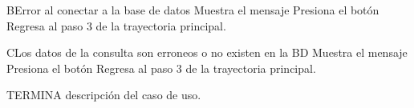 		\begin{UCtrayectoriaA}{B}{Error al conectar a la base de datos}
			\UCpaso[\UCsist] Muestra el mensaje 
			\UCpaso[\UCactor] Presiona el botón 
			\UCpaso[\UCsist] Regresa al paso 3 de la trayectoria principal.
		\end{UCtrayectoriaA}
		
		\begin{UCtrayectoriaA}{C}{Los datos de la consulta son erroneos o no existen en la BD}
			\UCpaso[\UCsist] Muestra el mensaje 
			\UCpaso[\UCactor] Presiona el botón 
			\UCpaso[\UCsist] Regresa al paso 3 de la trayectoria principal.
		\end{UCtrayectoriaA}
		
TERMINA descripción del caso de uso.


